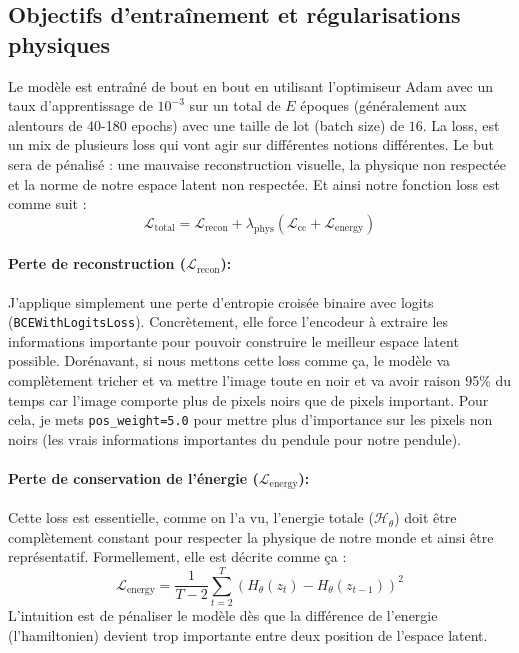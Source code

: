 \documentclass[11pt]{article}
\begin{document}
\subsection{Objectifs d'entraînement et régularisations physiques}
\label{subsec:objectifs}
Le modèle est entraîné de bout en bout en utilisant l'optimiseur Adam avec un taux d'apprentissage de $10^{-3}$ sur un total de $E$ époques (généralement aux alentours de 40-180 epochs) avec une taille de lot (batch size) de $16$. La loss, est un mix de plusieurs loss qui vont agir sur différentes notions différentes. Le but sera de pénalisé : une mauvaise reconstruction visuelle, la physique non respectée et la norme de notre espace latent non respectée. Et ainsi notre fonction loss est comme suit :
\begin{equation}
    \mathcal{L}_{\text{total}} = \mathcal{L}_{\text{recon}} + \lambda_{\text{phys}} \left( \mathcal{L}_{\text{cc}} + \mathcal{L}_{\text{energy}} \right)
\end{equation}

\paragraph{Perte de reconstruction ($\mathcal{L}_{\text{recon}}$):}
J'applique simplement une perte d'entropie croisée binaire avec logits (\texttt{BCEWithLogitsLoss}). Concrètement, elle force l'encodeur à extraire les informations importante pour pouvoir construire le meilleur espace latent possible. Dorénavant, si nous mettons cette loss comme ça, le modèle va complètement tricher et va mettre l'image toute en noir et va avoir raison 95\% du temps car l'image comporte plus de pixels noirs que de pixels important. Pour cela, je mets \texttt{pos\_weight=5.0} pour mettre plus d'importance sur les pixels non noirs (les vrais informations importantes du pendule pour notre pendule).

\paragraph{Perte de conservation de l'énergie ($\mathcal{L}_{\text{energy}}$):}
Cette loss est essentielle, comme on l'a vu, l'energie totale ($\mathcal{H}_{\theta}$) doit être complètement constant pour respecter la physique de notre monde et ainsi être représentatif. Formellement, elle est décrite comme ça :
    \begin{equation}
        \mathcal{L}_{\text{energy}} = \frac{1}{T-2} \sum_{t=2}^T \left( H_{\theta}(z_t) - H_{\theta}(z_{t-1}) \right)^2
    \end{equation}
L'intuition est de pénaliser le modèle dès que la différence de l'energie (l'hamiltonien) devient trop importante entre deux position de l'espace latent.
\end{document}
